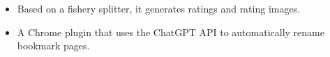 \documentclass{resume}
\begin{document}
\begin{itemize}
  \item Based on a fishery splitter, it generates ratings and rating images.
  \item A Chrome plugin that uses the ChatGPT API to automatically rename bookmark pages.
\end{itemize}


\end{document}
